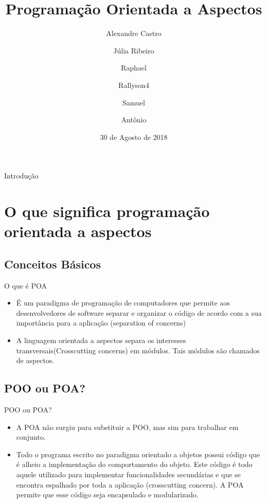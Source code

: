 \documentclass{beamer}
\title{Programação Orientada a Aspectos}
\subtitle{}
\author{Alexandre Castro\inst{1} \and Júlia Ribeiro\inst{2} \and Raphael\inst{3} \and Rallyson{4} \and Samuel\inst{5}\and Antônio\inst{6}}
\institute[Instituto Federal de Alagoas] 
{
  \inst{1}%
  Sistemas de informação\\
  Instituto Federal de Alagoas
 }
\date{30 de Agosto de 2018}
\begin{document}
\begin{frame}
  \titlepage
\end{frame}

\begin{frame}{Introdução}
  \tableofcontents
 
\end{frame}


\section{O que significa programação  orientada a aspectos}

\subsection{Conceitos Básicos}

\begin{frame}{O que é POA}{}
  \begin{itemize}
  
  
  \item {
   É um paradigma de programação de computadores que permite aos desenvolvedores de software separar e organizar o código de acordo com a sua importância para a aplicação (separation of concerns)
  }
  
  
  \item{A linguagem orientada a aspectos separa os interesses transversais(Crosscutting concerns) em módulos. Tais módulos são chamados de aspectos.
  }
  
  
  \end{itemize}
\end{frame}

\subsection{POO ou POA?}


\begin{frame}{POO ou POA?}
  \begin{itemize}
  
  
  \item {
     A POA não surgiu para substituir a POO, mas sim para trabalhar em conjunto.
    \pause %
  }
  \item {   
    Todo o programa escrito no paradigma orientado a objetos possui código que é alheio a implementação do comportamento do objeto. Este código é todo aquele utilizado para implementar funcionalidades secundárias e que se encontra espalhado por toda a aplicação (crosscutting concern). A POA permite que esse código seja encapsulado e modularizado.
  }
  
  \end{itemize}
\end{frame}
\end{document}
